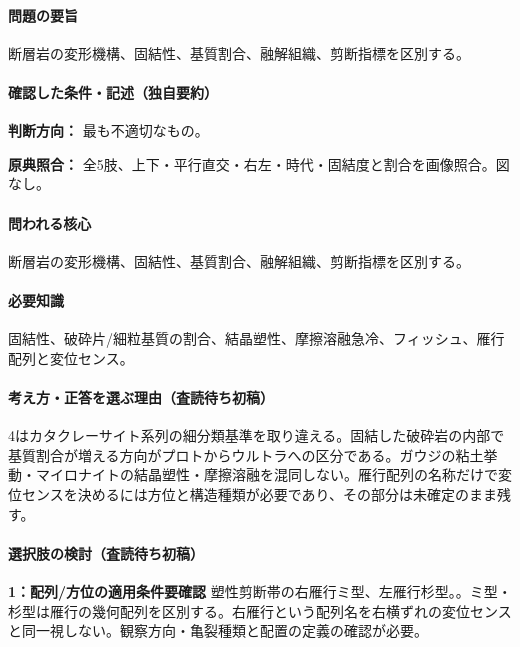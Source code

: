 \paragraph{問題の要旨} 断層岩の変形機構、固結性、基質割合、融解組織、剪断指標を区別する。

\paragraph{確認した条件・記述（独自要約）}\mbox{}\par

\noindent\textbf{判断方向：} 最も不適切なもの。\par

\noindent\textbf{原典照合：} 全5肢、上下・平行直交・右左・時代・固結度と割合を画像照合。図なし。\par

\paragraph{問われる核心} 断層岩の変形機構、固結性、基質割合、融解組織、剪断指標を区別する。

\paragraph{必要知識} 固結性、破砕片/細粒基質の割合、結晶塑性、摩擦溶融急冷、フィッシュ、雁行配列と変位センス。

\paragraph{考え方・正答を選ぶ理由（査読待ち初稿）} 4はカタクレーサイト系列の細分類基準を取り違える。固結した破砕岩の内部で基質割合が増える方向がプロトからウルトラへの区分である。ガウジの粘土挙動・マイロナイトの結晶塑性・摩擦溶融を混同しない。雁行配列の名称だけで変位センスを決めるには方位と構造種類が必要であり、その部分は未確定のまま残す。

\paragraph{選択肢の検討（査読待ち初稿）}\mbox{}\par

\noindent\textbf{1：配列/方位の適用条件要確認} 塑性剪断帯の右雁行ミ型、左雁行杉型。。ミ型・杉型は雁行の幾何配列を区別する。右雁行という配列名を右横ずれの変位センスと同一視しない。観察方向・亀裂種類と配置の定義の確認が必要。\par

